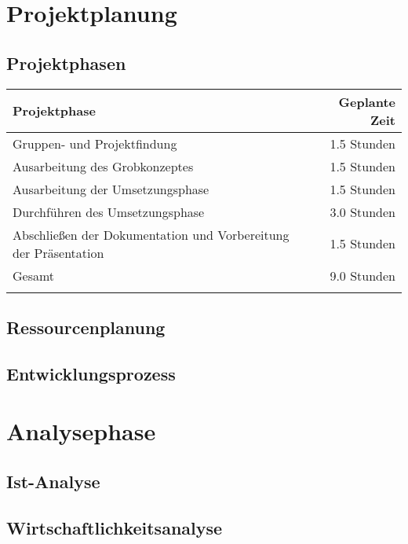 \documentclass[ngerman,11pt,a4paper,titlepage]{article}
\begin{document}
	\section{Projektplanung}
	\label{sec:projektplanung}
	\projektplanungText
	
	\subsection{Projektphasen}
	\label{subsec:projektphasen}
	\projektphasenText
	\neuerAbsatz
	\begin{tabular}[h]{l|r}
		Projektphase & Geplante Zeit \\
		\hline
		Gruppen- und Projektfindung & 1.5 Stunden \\
		\hline
		Ausarbeitung des Grobkonzeptes & 1.5 Stunden \\
		\hline
		Ausarbeitung der Umsetzungsphase & 1.5 Stunden \\
		\hline
		Durchführen des Umsetzungsphase & 3.0 Stunden \\
		\hline
		Abschließen der Dokumentation und Vorbereitung der Präsentation & 1.5 Stunden \\
		\hline
		Gesamt & 9.0 Stunden \\
		\label{tab:tabelle1}
	\end{tabular}
	
	\subsection{Ressourcenplanung}
	\label{subsec:ressourcenplanung}
	\ressourcenplanungText
	
	\subsection{Entwicklungsprozess}
	\label{subsec:entwicklungsprozess}
	\entwicklungsprozessText
	\pagebreak
	
	\section{Analysephase}
	\label{sec:analysephase}
	\analysephaseText
	
	\subsection{Ist-Analyse}
	\label{subsec:istanalyse}
	\istanalyseText
	
	\subsection{Wirtschaftlichkeitsanalyse}
	\label{subsec:wirtschaftlichkeitsanalyse}
	\wirtschaftlichkeitsanalyseText
	
\end{document}
